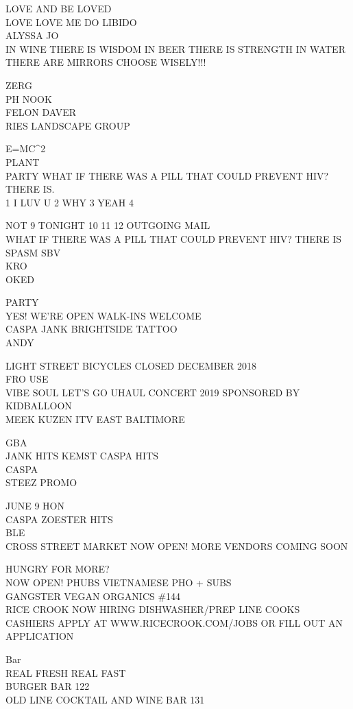 \documentclass[10pt,letterpaper]{article}
\begin{document}
LOVE AND BE LOVED\\
LOVE LOVE ME DO LIBIDO\\
ALYSSA JO\\
IN WINE THERE IS WISDOM IN BEER THERE IS STRENGTH IN WATER THERE ARE MIRRORS CHOOSE WISELY!!!

ZERG\\
PH NOOK\\
FELON DAVER\\
RIES LANDSCAPE GROUP

E=MC\^{}2\\
PLANT\\
PARTY WHAT IF THERE WAS A PILL THAT COULD PREVENT HIV?  THERE IS.\\
1 I LUV U 2 WHY 3 YEAH 4

NOT 9 TONIGHT 10 11 12 OUTGOING MAIL\\
WHAT IF THERE WAS A PILL THAT COULD PREVENT HIV?  THERE IS SPASM SBV\\
KRO\\
OKED

PARTY\\
YES!  WE'RE OPEN WALK{-}INS WELCOME\\
CASPA JANK BRIGHTSIDE TATTOO\\
ANDY

LIGHT STREET BICYCLES CLOSED DECEMBER 2018\\
FRO USE\\
VIBE SOUL LET'S GO UHAUL CONCERT 2019 SPONSORED BY KIDBALLOON\\
MEEK KUZEN ITV EAST BALTIMORE

GBA\\
JANK HITS KEMST CASPA HITS\\
CASPA\\
STEEZ PROMO

JUNE 9 HON\\
CASPA ZOESTER HITS\\
BLE\\
CROSS STREET MARKET NOW OPEN!  MORE VENDORS COMING SOON

HUNGRY FOR MORE?\\
NOW OPEN!  PHUBS VIETNAMESE PHO + SUBS\\
GANGSTER VEGAN ORGANICS \#144\\
RICE CROOK NOW HIRING DISHWASHER/PREP LINE COOKS CASHIERS APPLY AT WWW.RICECROOK.COM/JOBS OR FILL OUT AN APPLICATION

Bar\\
REAL FRESH REAL FAST\\
BURGER BAR 122\\
OLD LINE COCKTAIL AND WINE BAR 131
\end{document}
